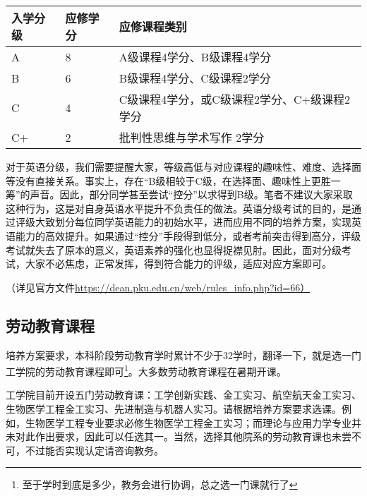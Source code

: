 \documentclass[11pt,oneside]{book}
\begin{document}
\begin{table}[htbp]
\centering

\begin{tabular}{| l | l | l |}
\hline
入学分级 & 应修学分 & 应修课程类别 \\
\hline
A & 8 & A级课程4学分、B级课程4学分 \\
\hline
B & 6 & B级课程4学分、C级课程2学分 \\
\hline
C & 4 & C级课程4学分，或C级课程2学分、C+级课程2学分 \\
\hline
C$+$  & 2 & 批判性思维与学术写作\hspace{6pt} 2学分 \\
\hline

\end{tabular}

\end{table}

对于英语分级，我们需要提醒大家，等级高低与对应课程的趣味性、难度、选择面等没有直接关系。事实上，存在“B级相较于C级，在选择面、趣味性上更胜一筹”的声音。因此，部分同学甚至尝试“控分”以求得到B级。笔者不建议大家采取这种行为，这是对自身英语水平提升不负责任的做法。英语分级考试的目的，是通过评级大致划分每位同学英语能力的初始水平，进而应用不同的培养方案，实现英语能力的高效提升。如果通过“控分”手段得到低分，或者考前突击得到高分，评级考试就失去了原本的意义，英语素养的强化也显得捉襟见肘。因此，面对分级考试，大家不必焦虑，正常发挥，得到符合能力的评级，适应对应方案即可。

（详见官方文件\href{https://dean.pku.edu.cn/web/rules_info.php?id=66\%EF\%BC\%89}{https://dean.pku.edu.cn/web/rules\_info.php?id=66）}

\subsection{劳动教育课程}
培养方案要求，本科阶段劳动教育学时累计不少于32学时，翻译一下，就是选一门工学院的劳动教育课程即可\footnote{至于学时到底是多少，教务会进行协调，总之选一门课就行了}。大多数劳动教育课程在暑期开课。

\vspace{10pt}

工学院目前开设五门劳动教育课：工学创新实践、金工实习、航空航天金工实习、生物医学工程金工实习、先进制造与机器人实习。请根据培养方案要求选课。例如，生物医学工程专业要求必修生物医学工程金工实习；而理论与应用力学专业并未对此作出要求，因此可以任选其一。当然，选择其他院系的劳动教育课也未尝不可，不过能否实现认定请咨询教务。

\vspace{10pt}
\end{document}
